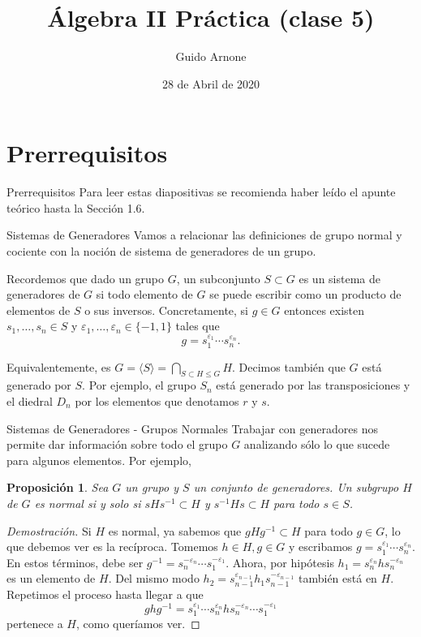 \documentclass{beamer}
\title[Álgebra II Práctica (clase 5)] {Álgebra II Práctica (clase 5)}
\author[G. Arnone]{Guido Arnone}
\institute[]{Universidad de Buenos Aires}
\date[2020/04/28]{28 de Abril de 2020}
\newtheorem{proposicion}[teorema]{Proposici\'on}
\begin{document}
{
\begin{frame}
\titlepage
\end{frame}
}

\section{Prerrequisitos}
\begin{frame}{Prerrequisitos}
Para leer estas diapositivas se recomienda haber leído el apunte teórico hasta la Sección 1.6.

\medskip

\end{frame}

\begin{frame}{Sistemas de Generadores}
Vamos a relacionar las definiciones de grupo normal y cociente con la noción de sistema de generadores de un grupo.

\medskip
{} 
Recordemos que dado un grupo $G$, un subconjunto $S \subset G$ es un \alert{sistema de generadores} de $G$ si todo elemento de $G$ se puede escribir como un producto de elementos de $S$ o sus inversos.  Concretamente, si $g \in G$ entonces existen $s_1, \dots, s_n \in S$ y $\varepsilon_1, \dots, \varepsilon_n \in \{-1,1\}$ tales que
\[
g = s_1^{\varepsilon_1} \cdots s_n^{\varepsilon_n}.
\]

 Equivalentemente, es $G = \langle S \rangle = \bigcap_{S \subset H \leq G}H$.
 Decimos también que $G$ \alert{está generado} por $S$.  Por ejemplo, el grupo $S_n$ está generado por las transposiciones y el diedral $D_n$ por los elementos que denotamos $r$ y $s$.
\end{frame}


\begin{frame}{Sistemas de Generadores - Grupos Normales}
Trabajar con generadores nos permite dar información sobre todo el grupo $G$ analizando sólo lo que sucede para algunos elementos. Por ejemplo,

\begin{proposicion} Sea $G$ un grupo y $S$ un conjunto de generadores. Un subgrupo $H$ de $G$ es normal si y solo si $sHs^{-1} \subset H$ y $s^{-1}Hs \subset H$ para todo $s \in S$.
\end{proposicion}
\begin{proof}[Demostración] Si $H$ es normal, ya sabemos que $gHg^{-1} \subset H$ para \alert{todo} $g \in G$, lo que debemos ver es la recíproca.  Tomemos $h \in H,g \in G$ y escribamos $g = s_1^{\varepsilon_1} \cdots s_n^{\varepsilon_n}$.  En estos términos, debe ser $g^{-1} = s_n^{-\varepsilon_n} \cdots s_1^{-\varepsilon_1}$.  Ahora, por hipótesis $h_1 = s_n^{\varepsilon_n}hs_n^{-\varepsilon_n}$ es un elemento de $H$.  Del mismo modo $h_2 = s_{n-1}^{\varepsilon_{n-1}}h_1s_{n-1}^{-\varepsilon_{n-1}}$ también está en $H$. Repetimos el proceso hasta llegar a que
\[
ghg^{-1} = s_1^{\varepsilon_1} \cdots s_n^{\varepsilon_n}h s_n^{-\varepsilon_n} \cdots s_1^{-\varepsilon_1}
\]
pertenece a $H$, como queríamos ver.
\end{proof}
\end{frame}
  
\end{document}
